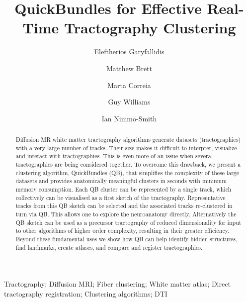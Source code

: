 \documentclass[preprint,authoryear,a4paper,10pt,onecolumn]{elsarticle}
\begin{document}
\begin{frontmatter}

\title{QuickBundles for Effective Real-Time Tractography Clustering}

\author[UC]{Eleftherios Garyfallidis}
\address[UC]{University of Cambridge, Wolfson College, Barton Road, Cambridge CB3 9BB, UK}

\author[Berkeley]{Matthew Brett}
\address[Berkeley]{University of California, Henry H. Wheeler, Jr. Brain Imaging Center, 10 Giannini Hall, Berkeley, CA 94720,USA}

\author[CBU]{Marta Correia} 
\address[CBU]{MRC Cognition and Brain Sciences Unit, 15 Chaucer Road, Cambridge CB2 7EF, UK}

\author[WBIC]{Guy Williams} 
\address[WBIC]{The Wolfson Brain Imaging Centre, University of Cambridge, Box 65, Addenbrooke's Hospital, Cambridge CB2 0QQ, UK}

\author[CBU]{Ian Nimmo-Smith} 

\begin{abstract}
  Diffusion MR white matter tractography algorithms generate datasets
  (tractographies) with a very large number of tracks. Their size makes
  it difficult to interpret, visualize and interact with
  tractographies. This is even more of an issue when several
  tractographies are being considered together. To overcome this
  drawback, we present a clustering algorithm, QuickBundles (QB), that
  simplifies the complexity of these large datasets and provides
  anatomically meaningful clusters in seconds with minimum memory
  consumption. Each QB cluster can be represented by a single track,
  which collectively can be visualised as a first sketch of the
  tractography.  Representative tracks from this QB sketch can be
  selected and the associated tracks re-clustered in turn via QB. This
  allows one to explore the neuroanatomy directly. Alternatively the QB
  sketch can be used as a precursor tractography of reduced
  dimensionality for input to other algorithms of higher order
  complexity, resulting in their greater efficiency. Beyond these
  fundamental uses we show how QB can help identify hidden structures,
  find landmarks, create atlases, and compare and register
  tractographies.
\end{abstract}

\begin{keyword}
Tractography;
Diffusion MRI;
Fiber clustering;
White matter atlas;
Direct tractography registration;
Clustering algorithms;
DTI
\end{keyword}
\end{frontmatter}
\end{document}

